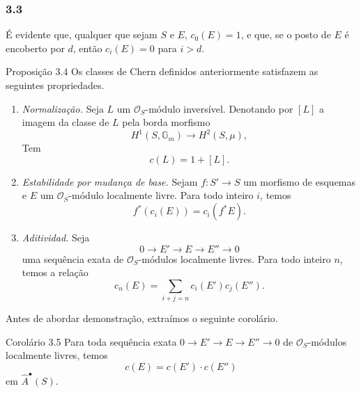\subsubsection*{3.3}
É evidente que, qualquer que sejam $S$ e $E$, $c_0(E)=1$, e que, se o posto de $E$ é encoberto por $d$, então $c_i(E)=0$ para $i>d$.

\begin{statement}{Proposição 3.4}
Os classes de Chern definidos anteriormente satisfazem as seguintes propriedades.
\begin{enumerate}[label=(\roman*)]
\item \emph{Normalização.} Seja $L$ um $\mathcal O_S$-módulo inversível. Denotando por $[L]$ a imagem da classe de $L$ pela borda morfismo
\[
H^1(S,\mathbb G_m)\longrightarrow H^2(S,\mu),
\]
Tem
\[
c(L)=1+[L].
\]
\item \emph{Estabilidade por mudança de base.} Sejam $f:S'\to S$ um morfismo de esquemas e $E$ um $\mathcal O_S$-módulo localmente livre. Para todo inteiro $i$, temos
\[
f^*(c_i(E))=c_i(f^*E).
\]
\item \emph{Aditividad.} Seja
\[
0\to E'\to E\to E''\to0
\]
uma sequência exata de $\mathcal O_S$-módulos localmente livres. Para todo inteiro $n$, temos a relação
\[
c_n(E)=\sum_{i+j=n}c_i(E')c_j(E'').
\]
\end{enumerate}
\end{statement}

Antes de abordar demonstração, extraímos o seguinte corolário.

\begin{statement}{Corolário 3.5}
Para toda sequência exata $0\to E'\to E\to E''\to0$ de $\mathcal O_S$-módulos localmente livres, temos
\[
c(E)=c(E')\cdot c(E'')
\]
em $\widehat A^{\bullet}(S)$.
\end{statement}
